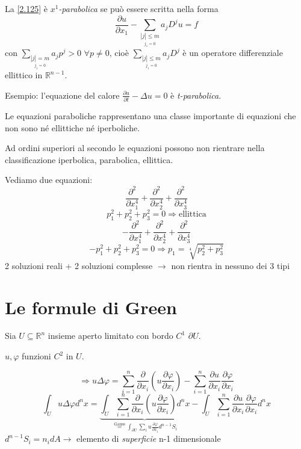 \documentclass[a4paper,11pt]{report}
\newcommand{\R}{\mathbb{R}}
\newcommand{\Rn}{\mathbb{R}^n}
\begin{document}
La \eqref{2.125} \`e \emph{$x^1$-parabolica} se pu\`o essere scritta nella forma
\begin{equation}
\frac{\partial u}{\partial x_1} - \sum_{\underset{j_1=0}{|j|\leq m}}a_jD^j u=f 
\label{2.131}
\end{equation}
con $\sum_{\underset{j_1=0}{|j| = m}} a_jp^j >0$ $\forall p\neq 0$, cio\`e $\sum_{\underset{j_1=0}{|j|\leq m}} a_jD^j$ è un operatore differenziale ellittico in $\R^{n-1}$.

\medskip

Esempio: l'equazione del calore $\frac{\partial u}{\partial t} - \Delta u=0$ \`e \emph{t-parabolica}.

Le equazioni paraboliche rappresentano una classe importante di equazioni che non sono n\'e ellittiche n\'e iperboliche.

Ad ordini superiori al secondo le equazioni possono non rientrare nella classificazione iperbolica, parabolica, ellittica.

Vediamo due equazioni:
\[
\frac{\partial^2}{\partial x_1^4}+\frac{\partial^2}{\partial x_2^4}+\frac{\partial^2}{\partial x_3^4}
\]
\[
p_1^2+p_2^2+p_3^2=0 \Rightarrow \text{ellittica}
\]
\[
-\frac{\partial^2}{\partial x_1^4}+\frac{\partial^2}{\partial x_2^4}+\frac{\partial^2}{\partial x_3^4}
\]
\[
-p_1^2+p_2^2+p_3^2=0 \Rightarrow p_1=\sqrt[4]{p_2^2+p_3^2}
\]
2 soluzioni reali + 2 soluzioni complesse $\rightarrow$ non rientra in nessuno dei 3 tipi

\section{Le formule di Green} %

Sia $U\subseteq \Rn$ insieme aperto limitato con bordo $C^1$ $\partial U$.


$u,\varphi$ funzioni $C^2$ in $U$.

\[
\Rightarrow u\Delta \varphi = \sum_{i=1}^n\frac{\partial}{\partial x_i}\left(u\frac{\partial \varphi}{\partial x_i} \right) - \sum_{i=1}^{n}\frac{\partial u}{\partial x_i}\frac{\partial \varphi}{\partial x_i}
\]
\[
\int_{U}u\Delta \varphi d^n x=\underbrace{\int_{U}\sum_{i=1}^n\frac{\partial}{\partial x_i}\left(u\frac{\partial \varphi}{\partial x_i} \right)d^n x}_{ \overset{\text{Gauss}}{=}\int_{\partial U}\sum_i u\frac{\partial \varphi}{\partial x_i}d^{n-1}S_i} - \int_{U} \sum_{i=1}^{n} \frac{\partial u}{\partial x_i}\frac{\partial \varphi}{\partial x_i}d^n x
\]
$d^{n-1}S_i=n_i dA \rightarrow$ elemento di \emph{superficie} n-1 dimensionale
\end{document}
